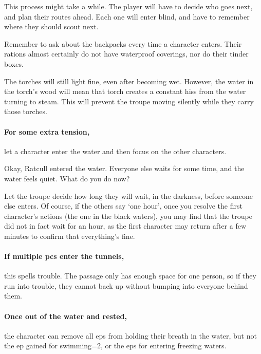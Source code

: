 \begin{multicols}{2}
{  This process might take a while.
  The player will have to decide who goes next, and plan their routes ahead.
  Each one will enter blind, and have to remember where they should scout next.

  Remember to ask about the backpacks every time a character enters.
  Their rations almost certainly do not have waterproof coverings, nor do their tinder boxes.

  The torches will still light fine, even after becoming wet.
  However, the water in the torch's wood will mean that torch creates a constant hiss from the water turning to steam.
  This will prevent the troupe moving silently while they carry those torches.

  \paragraph{For some extra tension,}
  let a character enter the water and then focus on the other characters.

  \begin{speechtext}
    Okay, Ratcull entered the water.
    Everyone else waits for some time, and the water feels quiet.
    What do you do now?
  \end{speechtext}

  Let the troupe decide how long they will wait, in the darkness, before someone else enters.
  Of course, if the others say `one hour', once you resolve the first character's actions (the one in the black waters), you may find that the troupe did not in fact wait for an hour, as the first character may return after a few minutes to confirm that everything's fine.
}{}

\paragraph{If multiple \glspl{pc} enter the tunnels,}
this spells trouble.
The passage only has enough space for one person, so if they run into trouble, they cannot back up without bumping into everyone behind them.

\paragraph{Once out of the water and rested,}
the character can remove all \glspl{ep} from holding their breath in the water, but not the \gls{ep} gained for swimming\ifnum\value{temperature}=2\else, or the \glspl{ep} for entering freezing waters\fi.


\end{multicols}
